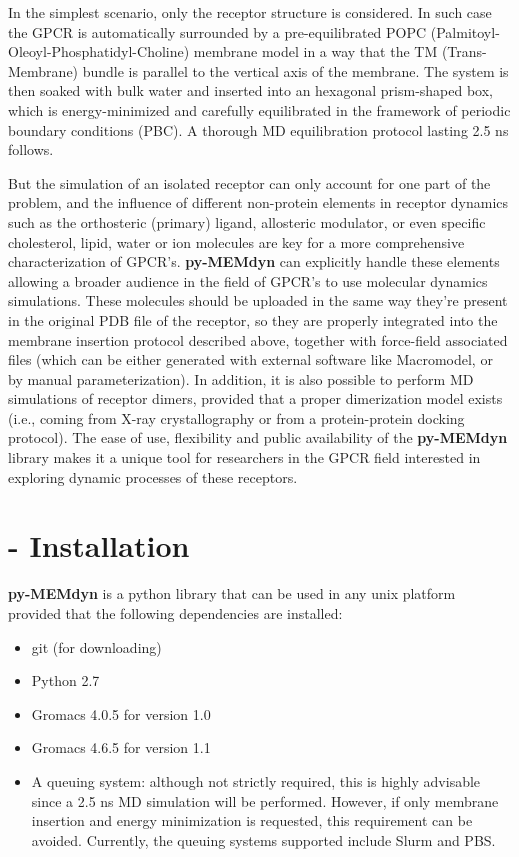 \documentclass[10pt, oneside, pdftex]{article}
\begin{document}
In   the   simplest  scenario,   only   the   receptor  structure   is
considered. In  such case  the GPCR is  automatically surrounded  by a
pre-equilibrated POPC (Palmitoyl-Oleoyl-Phosphatidyl-Choline) membrane
model in a way that the  TM (Trans-Membrane) bundle is parallel to the
vertical axis  of the  membrane. The system  is then soaked  with bulk
water  and  inserted into  an  hexagonal  prism-shaped  box, which  is
energy-minimized  and  carefully  equilibrated  in  the  framework  of
periodic  boundary  conditions  (PBC).  A  thorough  MD  equilibration
protocol lasting 2.5 ns follows.

But the  simulation of an isolated  receptor can only  account for one
part  of  the problem,  and  the  influence  of different  non-protein
elements  in  receptor  dynamics  such as  the  orthosteric  (primary)
ligand,  allosteric modulator,  or even  specific  cholesterol, lipid,
water   or  ion   molecules   are  key   for   a  more   comprehensive
characterization of GPCR's.   \textbf{py-MEMdyn} can explicitly handle
these elements allowing  a broader audience in the  field of GPCR's to
use molecular dynamics simulations. These molecules should be uploaded
in  the same  way they're  present  in the  original PDB  file of  the
receptor, so they are  properly integrated into the membrane insertion
protocol described  above, together with  force-field associated files
(which can be either generated with external software like Macromodel,
or by manual  parameterization).  In addition, it is  also possible to
perform  MD simulations  of receptor  dimers, provided  that  a proper
dimerization model exists (i.e.,  coming from X-ray crystallography or
from  a   protein-protein  docking   protocol).   The  ease   of  use,
flexibility and public  availability of the \textbf{py-MEMdyn} library
makes it a unique tool for researchers in the GPCR field interested in
exploring dynamic processes of these receptors.

\section*{ - Installation}
\textbf{py-MEMdyn} is a python library that can be used in  any unix
platform provided that the following dependencies are installed:
\begin{itemize}\itemsep0em
\item {git (for downloading)}
\item {Python 2.7}
\item {Gromacs 4.0.5 for version 1.0}
\item {Gromacs 4.6.5 for version 1.1}
\item {A queuing system: although  not strictly required, this is highly
  advisable since a 2.5 ns  MD simulation will be performed. However, if
  only membrane  insertion and energy minimization  is requested, this
  requirement can be avoided. Currently, the queuing systems supported
  include Slurm and PBS.}
\end{itemize}
\end{document}
